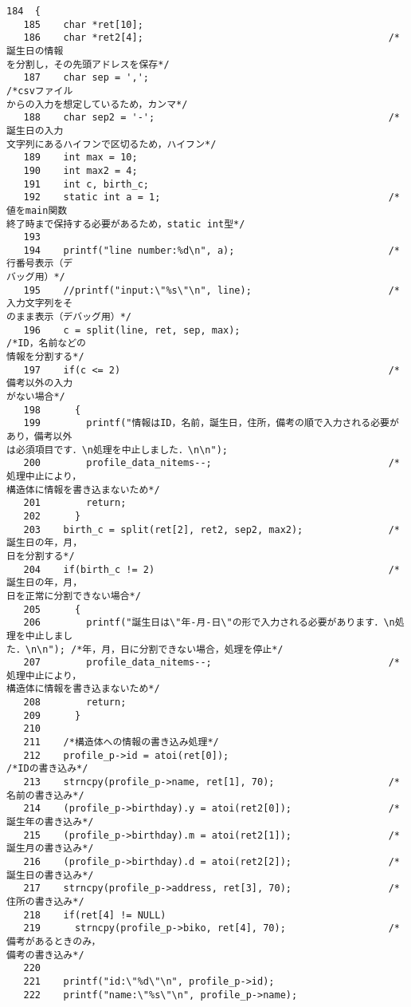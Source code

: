 \begin{Verbatim}[fontsize=\small, baselinestretch=0.8]
   184	{
   185	  char *ret[10];
   186	  char *ret2[4];                                           /*誕生日の情報
を分割し，その先頭アドレスを保存*/
   187	  char sep = ',';                                          /*csvファイル
からの入力を想定しているため，カンマ*/
   188	  char sep2 = '-';                                         /*誕生日の入力
文字列にあるハイフンで区切るため，ハイフン*/
   189	  int max = 10;
   190	  int max2 = 4;
   191	  int c, birth_c;
   192	  static int a = 1;                                        /*値をmain関数
終了時まで保持する必要があるため，static int型*/
   193	  
   194	  printf("line number:%d\n", a);                           /*行番号表示（デ
バッグ用）*/
   195	  //printf("input:\"%s\"\n", line);                        /*入力文字列をそ
のまま表示（デバッグ用）*/
   196	  c = split(line, ret, sep, max);                          /*ID，名前などの
情報を分割する*/
   197	  if(c <= 2)                                               /*備考以外の入力
がない場合*/
   198	    {
   199	      printf("情報はID，名前，誕生日，住所，備考の順で入力される必要があり，備考以外
は必須項目です．\n処理を中止しました．\n\n");
   200	      profile_data_nitems--;                               /*処理中止により，
構造体に情報を書き込まないため*/
   201	      return;
   202	    }
   203	  birth_c = split(ret[2], ret2, sep2, max2);               /*誕生日の年，月，
日を分割する*/
   204	  if(birth_c != 2)                                         /*誕生日の年，月，
日を正常に分割できない場合*/
   205	    {
   206	      printf("誕生日は\"年-月-日\"の形で入力される必要があります．\n処理を中止しまし
た．\n\n"); /*年，月，日に分割できない場合，処理を停止*/
   207	      profile_data_nitems--;                               /*処理中止により，
構造体に情報を書き込まないため*/
   208	      return;
   209	    }
   210	
   211	  /*構造体への情報の書き込み処理*/
   212	  profile_p->id = atoi(ret[0]);                            /*IDの書き込み*/
   213	  strncpy(profile_p->name, ret[1], 70);                    /*名前の書き込み*/
   214	  (profile_p->birthday).y = atoi(ret2[0]);                 /*誕生年の書き込み*/
   215	  (profile_p->birthday).m = atoi(ret2[1]);                 /*誕生月の書き込み*/
   216	  (profile_p->birthday).d = atoi(ret2[2]);                 /*誕生日の書き込み*/
   217	  strncpy(profile_p->address, ret[3], 70);                 /*住所の書き込み*/
   218	  if(ret[4] != NULL)
   219	    strncpy(profile_p->biko, ret[4], 70);                  /*備考があるときのみ，
備考の書き込み*/
   220	
   221	  printf("id:\"%d\"\n", profile_p->id);
   222	  printf("name:\"%s\"\n", profile_p->name);

\end{Verbatim}
